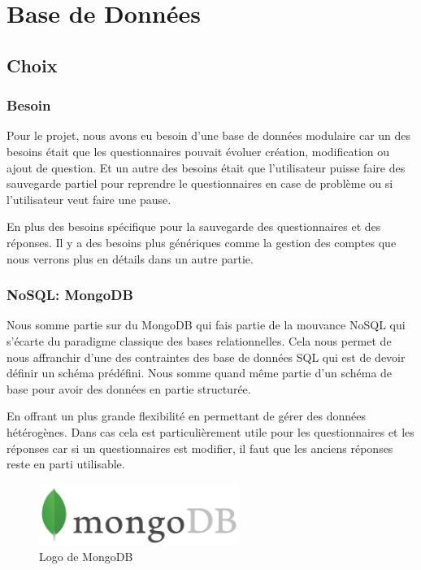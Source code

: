 \section{Base de Données}

\subsection{Choix}

\subsubsection{Besoin}

Pour le projet, nous avons eu besoin d'une base de données modulaire car un des besoins était que les questionnaires pouvait évoluer création, modification ou ajout de question. Et un autre des besoins était que l'utilisateur puisse faire des sauvegarde partiel pour reprendre le questionnaires en case de problème ou si l'utilisateur veut faire une pause. 

En plus des besoins spécifique pour la sauvegarde des questionnaires et des réponses. Il y a des besoins plus génériques comme la gestion des comptes que nous verrons plus en détails dans un autre partie.

\subsubsection{NoSQL: MongoDB}

Nous somme partie sur du MongoDB qui fais partie de la mouvance NoSQL qui s'écarte du paradigme classique des bases relationnelles. Cela nous permet de nous affranchir d'une des contraintes des base de données SQL qui est de devoir définir un schéma prédéfini. Nous somme quand même partie d'un schéma de base pour avoir des données en partie structurée.

En offrant un plus grande flexibilité en permettant de gérer des données hétérogènes. Dans cas cela est particulièrement utile pour les questionnaires et les réponses car si un questionnaires est modifier, il faut que les anciens réponses reste en parti utilisable.

\begin{figure}[H]
    \begin{center}
    \includegraphics[height=2.0cm]{img/mongodb}
    \end{center}
    \caption{Logo de MongoDB}
\end{figure}

